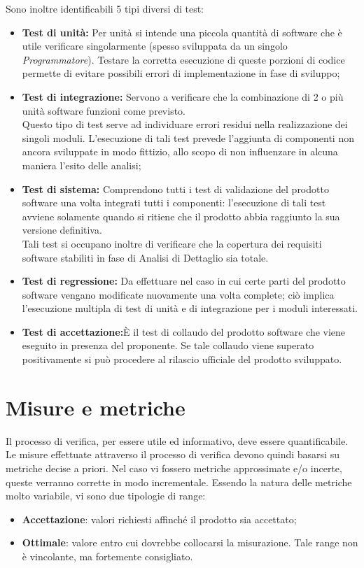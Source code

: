 \begin{itemize}
Sono inoltre identificabili 5 tipi diversi di test:
\begin{itemize}
	\item \textbf{Test di unità:} Per unità si intende una piccola quantità di software che è utile verificare singolarmente (spesso sviluppata da un singolo \textit{Programmatore}).
	Testare la corretta esecuzione di queste porzioni di codice permette di evitare possibili errori di implementazione in fase di sviluppo; 
	\item \textbf{Test di integrazione:} Servono a verificare che la combinazione di 2 o più unità
	software funzioni come previsto. \\
	Questo tipo di test serve ad individuare errori residui nella realizzazione dei singoli
	moduli.
	L'esecuzione di tali test prevede l'aggiunta di componenti non ancora sviluppate in modo fittizio, allo scopo di non influenzare in alcuna maniera l'esito delle analisi;
	\item \textbf{Test di sistema:} Comprendono tutti i test di validazione del prodotto software una volta integrati tutti i componenti: l'esecuzione 
	di tali test avviene solamente quando si ritiene che il prodotto abbia raggiunto la sua versione definitiva.\\
	Tali test si occupano inoltre di verificare che la copertura dei requisiti software stabiliti in fase di Analisi
	di Dettaglio sia totale.
	\item \textbf{Test di regressione:} Da effettuare nel caso in cui certe parti del prodotto software vengano modificate nuovamente una volta complete; ciò implica l'esecuzione multipla di test di unità e di integrazione per i moduli interessati.
	\item \textbf{Test di accettazione:}È il test di collaudo del prodotto software che viene eseguito in presenza del proponente.
	Se tale collaudo viene superato positivamente si può procedere al rilascio ufficiale del
	prodotto sviluppato.
\end{itemize}
	
\end{itemize}	
\chapter{Misure e metriche}\label{Metriche}
Il processo di verifica, per essere utile ed informativo, deve essere quantificabile. Le misure effettuate attraverso il processo di verifica devono quindi basarsi su metriche decise a priori.
Nel caso vi fossero metriche approssimate e/o incerte, queste verranno corrette in modo incrementale.
Essendo la natura delle metriche molto variabile, vi sono due tipologie di range:
\begin{itemize}
	\item \textbf{Accettazione}: valori richiesti affinché  il prodotto sia accettato;
	\item \textbf{Ottimale}: valore entro cui dovrebbe collocarsi la misurazione. Tale range non è vincolante, ma fortemente consigliato.
\end{itemize}
